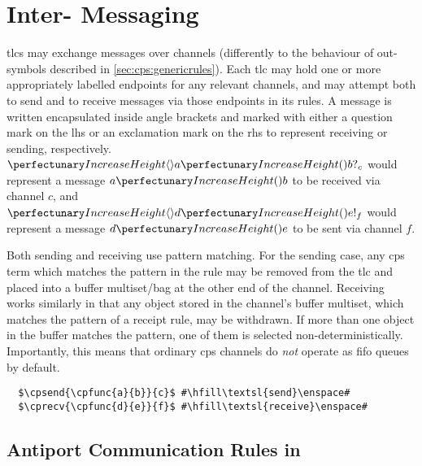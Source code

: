 \section{\label{sec:cps:intertlcmess}Inter- Messaging}

\Glspl{tlc} may exchange messages over channels (differently to the behaviour of out-symbols described in \cref{sec:cps:genericrules}).  Each \gls{tlc} may hold one or more appropriately labelled endpoints for any relevant channels, and may attempt both to send and to receive messages via those endpoints in its rules.  A message is written encapsulated inside angle brackets and marked with either a question mark on the \gls{lhs} or an exclamation mark on the \gls{rhs} to represent receiving or sending, respectively.  \Eg{} \(\cprecv{\cpfunc{a}{b}}{c}\) would represent a message \(\cpfunc{a}{b}\) to be received via channel \(c\), and \(\cpsend{\cpfunc{d}{e}}{f}\) would represent a message \(\cpfunc{d}{e}\) to be sent via channel \(f\).

Both sending and receiving use pattern matching.  For the sending case, any \gls{cps} term which matches the pattern in the rule may be removed from the \gls{tlc} and placed into a buffer multiset/bag at the other end of the channel.  Receiving works similarly in that any object stored in the channel's buffer multiset, which matches the pattern of a receipt rule, may be withdrawn.  If more than one object in the buffer matches the pattern, one of them is selected non-deterministically.  Importantly, this means that ordinary \gls{cps} channels do \emph{not} operate as \gls{fifo} queues by default.

\lstset{xleftmargin=.5in, xrightmargin=.5in} 
\begin{lstlisting}
  $\cpsend{\cpfunc{a}{b}}{c}$ #\hfill\textsl{send}\enspace#
  $\cprecv{\cpfunc{d}{e}}{f}$ #\hfill\textsl{receive}\enspace#
\end{lstlisting}

\subsection{\label{sec:cps:antiport}Antiport Communication Rules in }

